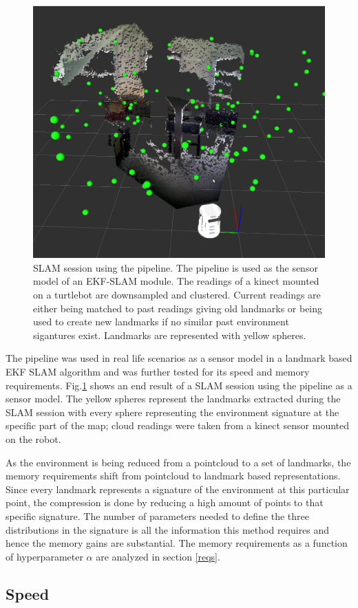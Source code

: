 \documentclass[twoside,hidelinks]{article}
\begin{document}
\begin{figure}
  \centering
    \includegraphics[width=.5\textwidth]{SLAM110landmarks2}
    \caption{SLAM session using the pipeline. The pipeline is used as the sensor model of an EKF-SLAM module. The readings of a kinect mounted on a turtlebot are downsampled and clustered. Current readings are either being matched to past readings giving old landmarks or being used to create new landmarks if no similar past environment sigantures exist. Landmarks are represented with yellow spheres. }
  \label{SLAM}
\end{figure}


The pipeline was used in real life scenarios as a sensor model in a landmark based EKF SLAM algorithm and was further tested for its speed and memory requirements. Fig.\ref{SLAM} shows an end result of a SLAM session using the pipeline as a sensor model. The yellow spheres represent the landmarks extracted during the SLAM session with every sphere representing the environment signature at the specific part of the map; cloud readings were taken from a kinect sensor mounted on the robot.


As the environment is being reduced from a pointcloud to a set of landmarks, the memory requirements shift from pointcloud to landmark based representations. Since every landmark represents a signature of the environment at this particular point, the compression is done by reducing a high amount of points to that specific signature. The number of parameters needed to define the three distributions in the signature is all the information this method requires and hence the memory gains are substantial. The memory requirements as a function of hyperparameter $\alpha$ are analyzed in section \ref{reqs}. 

\subsection{Speed}
\end{document}
